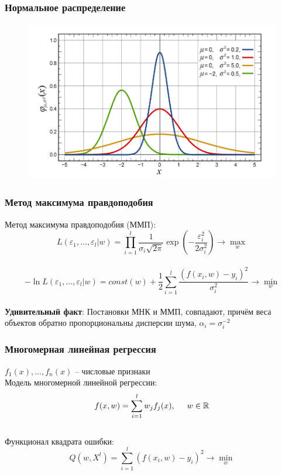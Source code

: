 \documentclass[12pt]{beamer}
\begin{document}
\begin{frame}\frametitle{Нормальное распределение}
\begin{figure}[htbp]
  \includegraphics[height=200pt, keepaspectratio = true]{images/gauss}   
\end{figure}
\end{frame}

\begin{frame}\frametitle{Метод максимума правдоподобия}
Метод максимума правдоподобия (ММП):\\
$$L(\varepsilon_1, \dots, \varepsilon_l | w) = \prod\limits_{i=1}^l \frac{1}{\sigma_i \sqrt{2\pi}} \exp (-\frac{\varepsilon_i^2}{2\sigma_i^2}  ) \rightarrow \max\limits_{w}$$\\
$$- \ln L(\varepsilon_1, \dots, \varepsilon_l| w) = const(w) + \frac{1}{2} \sum\limits_{i=1}^l \frac{(f(x_i, w) - y_i)^2}{\sigma_i^2}  \rightarrow \min\limits_{w}$$\\
\vspace{5mm}
\textbf{Удивительный факт}: Постановки МНК и ММП, совпадают, причём веса объектов
обратно пропорциональны дисперсии шума, $\alpha_i = \sigma_i^{-2}$
\end{frame}

\begin{frame}\frametitle{Многомерная линейная регрессия}
$f_1(x), \dots, f_n(x)$ -- числовые признаки\\
Модель многомерной линейной регрессии:\\
$$f (x, w) = \sum\limits_{i=1}^l w_j f_j(x), \hspace{5mm} w \in \mathbb{R}$$\\
\vspace{5mm}
Функционал квадрата ошибки:\\
$$Q(w,X^l) = \sum\limits_{i=1}^l (f (x_i, w) - y_i)^2  \rightarrow \min\limits_{w}$$\\

\end{frame}
\end{document}
